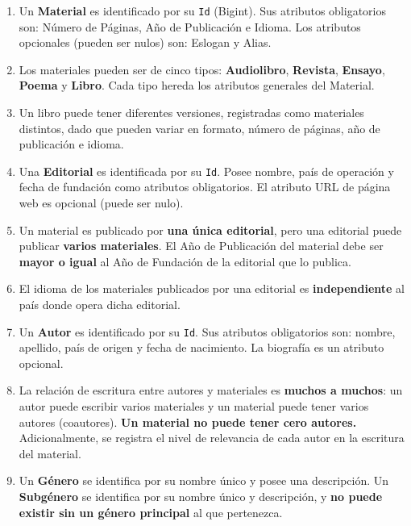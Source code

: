 \documentclass[12pt,a4paper]{article}
\begin{document}
\begin{enumerate}
    \item Un \textbf{Material} es identificado por su \texttt{Id} (Bigint). Sus atributos obligatorios son: Número de Páginas, Año de Publicación e Idioma. Los atributos opcionales (pueden ser nulos) son: Eslogan y Alias.

    \item Los materiales pueden ser de cinco tipos: \textbf{Audiolibro}, \textbf{Revista}, \textbf{Ensayo}, \textbf{Poema} y \textbf{Libro}. Cada tipo hereda los atributos generales del Material.

    \item Un libro puede tener diferentes versiones, registradas como materiales distintos, dado que pueden variar en formato, número de páginas, año de publicación e idioma.

    \item Una \textbf{Editorial} es identificada por su \texttt{Id}. Posee nombre, país de operación y fecha de fundación como atributos obligatorios. El atributo URL de página web es opcional (puede ser nulo).

    \item Un material es publicado por \textbf{una única editorial}, pero una editorial puede publicar \textbf{varios materiales}. El Año de Publicación del material debe ser \textbf{mayor o igual} al Año de Fundación de la editorial que lo publica.

    \item El idioma de los materiales publicados por una editorial es \textbf{independiente} al país donde opera dicha editorial.

    \item Un \textbf{Autor} es identificado por su \texttt{Id}. Sus atributos obligatorios son: nombre, apellido, país de origen y fecha de nacimiento. La biografía es un atributo opcional.

    \item La relación de escritura entre autores y materiales es \textbf{muchos a muchos}: un autor puede escribir varios materiales y un material puede tener varios autores (coautores). \textbf{Un material no puede tener cero autores.} Adicionalmente, se registra el nivel de relevancia de cada autor en la escritura del material.

    \item Un \textbf{Género} se identifica por su nombre único y posee una descripción. Un \textbf{Subgénero} se identifica por su nombre único y descripción, y \textbf{no puede existir sin un género principal} al que pertenezca.


\end{enumerate}
\end{document}

